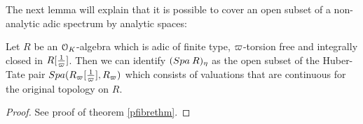 The next lemma will explain that it is possible to cover an open subset of a non-analytic adic spectrum by analytic spaces:
\begin{lemma}\label{pfibrelemma2}
Let $R$ be an $\mathcal{O}_K$-algebra which is adic of finite type, $\varpi$-torsion free and integrally closed in $R[\tfrac{1}{\varpi}]$. Then
we can identify $({Spa{\:R}})_{\eta}$ as the open subset of the Huber-Tate pair ${Spa({R_{\varpi}[\tfrac{1}{\varpi}]},{R_{\varpi}})}$ which consists of valuations that are continuous for the original topology on $R$.
\end{lemma}
\begin{proof}
See proof of theorem \ref{pfibrethm}.
\end{proof}
















